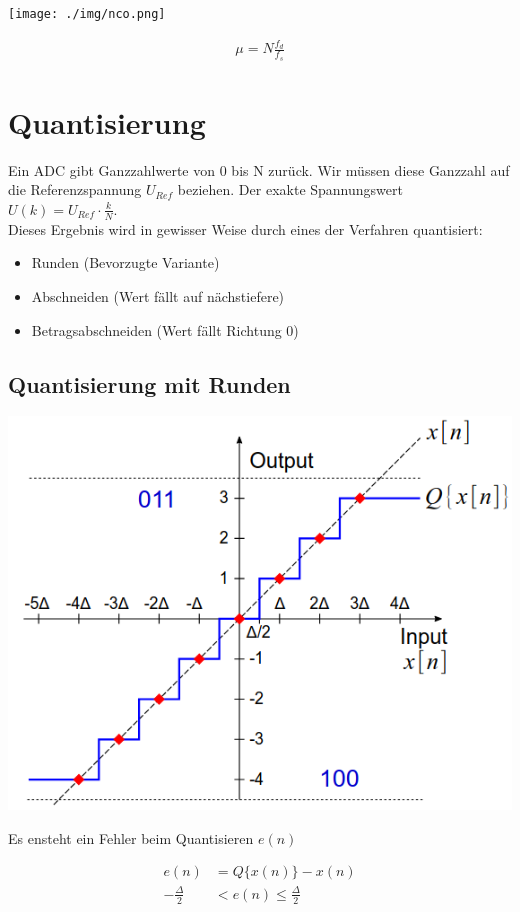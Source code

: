 \documentclass[10pt,a4paper]{article}
\begin{document}
\begin{center}
    \texttt{[image: ./img/nco.png]}
\end{center}

  \begin{mdframed}[style=exercise]
    \begin{align}
        \mu = N \frac{f_d}{f_s}  
    \end{align}
  \end{mdframed}

\section{Quantisierung}
Ein ADC gibt Ganzzahlwerte von 0 bis N zurück. Wir müssen diese Ganzzahl auf die Referenzspannung $U_{Ref}$ beziehen.
Der exakte Spannungswert $U(k) = U_{Ref}\cdot \frac{k}{N}$. \\
Dieses Ergebnis wird in gewisser Weise durch eines der Verfahren quantisiert:
\begin{itemize}
    \item Runden (Bevorzugte Variante)
    \item Abschneiden (Wert fällt auf nächstiefere)
    \item Betragsabschneiden (Wert fällt Richtung 0)
\end{itemize}

\subsection{Quantisierung mit Runden}
\begin{center}
    \includegraphics[width=.45\textwidth]{./img/rundung.png}
\end{center}
Es ensteht ein Fehler beim Quantisieren $e(n)$ 
  \begin{mdframed}[style=exercise]
    \begin{align}
        e(n) &= Q\{ x(n) \} - x(n)\\
        -\frac{\Delta}{2} & < e(n) \leq \frac{\Delta}{2}
    \end{align}
  \end{mdframed}
\end{document}
